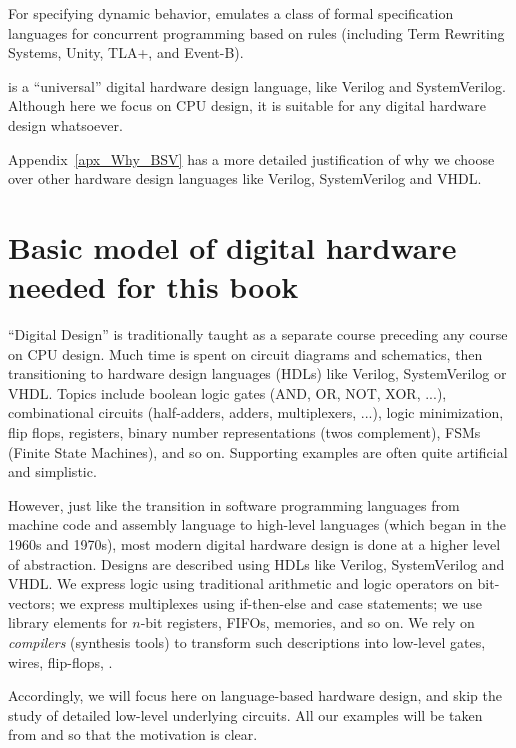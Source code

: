 For specifying dynamic behavior, {\BSV} emulates a class of formal
specification languages for concurrent programming based on rules
(including Term Rewriting Systems, Unity, TLA+, and Event-B).

{\BSV} is a ``universal'' digital hardware design language, like Verilog
and SystemVerilog.  Although here we focus on CPU design, it is
suitable for any digital hardware design whatsoever.

Appendix~\ref{apx_Why_BSV} has a more detailed justification of why we
choose {\BSV} over other hardware design languages like Verilog,
SystemVerilog and VHDL.


\section{Basic model of digital hardware needed for this book}

``Digital Design'' is traditionally taught as a separate course
preceding any course on CPU design.  Much time is spent on circuit
diagrams and schematics, then transitioning to hardware design
languages (HDLs) like Verilog, SystemVerilog or VHDL.  Topics include
boolean logic gates (AND, OR, NOT, XOR, ...), combinational circuits
(half-adders, adders, multiplexers, ...), logic minimization, flip
flops, registers, binary number representations (twos complement),
FSMs (Finite State Machines), and so on.  Supporting examples are
often quite artificial and simplistic.

However, just like the transition in software programming languages
from machine code and assembly language to high-level languages (which
began in the 1960s and 1970s), most modern digital hardware design is
done at a higher level of abstraction.  Designs are described using
HDLs like Verilog, SystemVerilog and VHDL.  We express logic using
traditional arithmetic and logic operators on bit-vectors; we express
multiplexes using if-then-else and case statements; we use library
elements for $n$-bit registers, FIFOs, memories, and so on.  We rely
on \emph{compilers} (synthesis tools) to transform such descriptions
into low-level gates, wires, flip-flops, {\etc}.

Accordingly, we will focus here on {\BSV} language-based hardware design,
and skip the study of detailed low-level underlying circuits.  All our
examples will be taken from {\DRUM} and {\FIFE} so that the motivation is
clear.

